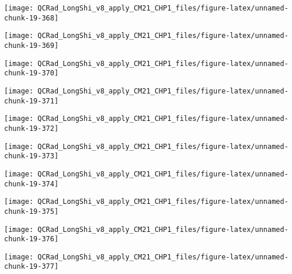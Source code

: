 \documentclass[
  10pt,
  a4paper,oneside]{article}
\begin{document}
\begin{center}\texttt{[image: QCRad\_LongShi\_v8\_apply\_CM21\_CHP1\_files/figure-latex/unnamed-chunk-19-368]} \end{center}

\begin{center}\texttt{[image: QCRad\_LongShi\_v8\_apply\_CM21\_CHP1\_files/figure-latex/unnamed-chunk-19-369]} \end{center}

\begin{center}\texttt{[image: QCRad\_LongShi\_v8\_apply\_CM21\_CHP1\_files/figure-latex/unnamed-chunk-19-370]} \end{center}

\begin{center}\texttt{[image: QCRad\_LongShi\_v8\_apply\_CM21\_CHP1\_files/figure-latex/unnamed-chunk-19-371]} \end{center}

\begin{center}\texttt{[image: QCRad\_LongShi\_v8\_apply\_CM21\_CHP1\_files/figure-latex/unnamed-chunk-19-372]} \end{center}

\begin{center}\texttt{[image: QCRad\_LongShi\_v8\_apply\_CM21\_CHP1\_files/figure-latex/unnamed-chunk-19-373]} \end{center}

\begin{center}\texttt{[image: QCRad\_LongShi\_v8\_apply\_CM21\_CHP1\_files/figure-latex/unnamed-chunk-19-374]} \end{center}

\begin{center}\texttt{[image: QCRad\_LongShi\_v8\_apply\_CM21\_CHP1\_files/figure-latex/unnamed-chunk-19-375]} \end{center}

\begin{center}\texttt{[image: QCRad\_LongShi\_v8\_apply\_CM21\_CHP1\_files/figure-latex/unnamed-chunk-19-376]} \end{center}

\begin{center}\texttt{[image: QCRad\_LongShi\_v8\_apply\_CM21\_CHP1\_files/figure-latex/unnamed-chunk-19-377]} \end{center}
\end{document}
